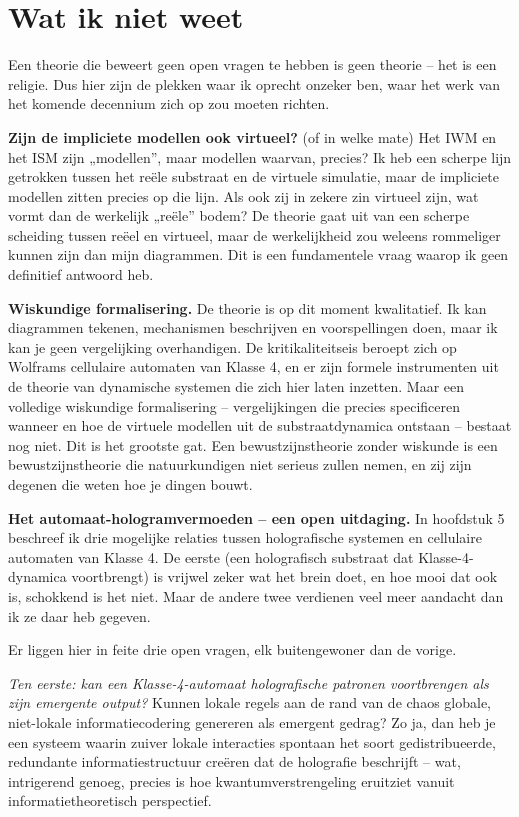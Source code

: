 \documentclass[11pt, twoside, openright]{book}
\begin{document}
\section*{Wat ik niet weet}

Een theorie die beweert geen open vragen te hebben is geen theorie -- het is een religie. Dus hier zijn de plekken waar ik oprecht onzeker ben, waar het werk van het komende decennium zich op zou moeten richten.

\textbf{Zijn de impliciete modellen ook virtueel?} (of in welke mate) Het IWM en het ISM zijn „modellen”, maar modellen waarvan, precies? Ik heb een scherpe lijn getrokken tussen het reële substraat en de virtuele simulatie, maar de impliciete modellen zitten precies op die lijn. Als ook zij in zekere zin virtueel zijn, wat vormt dan de werkelijk „reële” bodem? De theorie gaat uit van een scherpe scheiding tussen reëel en virtueel, maar de werkelijkheid zou weleens rommeliger kunnen zijn dan mijn diagrammen. Dit is een fundamentele vraag waarop ik geen definitief antwoord heb.

\textbf{Wiskundige formalisering.} De theorie is op dit moment kwalitatief. Ik kan diagrammen tekenen, mechanismen beschrijven en voorspellingen doen, maar ik kan je geen vergelijking overhandigen. De kritikaliteitseis beroept zich op Wolframs cellulaire automaten van Klasse 4, en er zijn formele instrumenten uit de theorie van dynamische systemen die zich hier laten inzetten. Maar een volledige wiskundige formalisering -- vergelijkingen die precies specificeren wanneer en hoe de virtuele modellen uit de substraatdynamica ontstaan -- bestaat nog niet. Dit is het grootste gat. Een bewustzijnstheorie zonder wiskunde is een bewustzijnstheorie die natuurkundigen niet serieus zullen nemen, en zij zijn degenen die weten hoe je dingen bouwt.

\textbf{Het automaat-hologramvermoeden -- een open uitdaging.} In hoofdstuk 5 beschreef ik drie mogelijke relaties tussen holografische systemen en cellulaire automaten van Klasse 4. De eerste (een holografisch substraat dat Klasse-4-dynamica voortbrengt) is vrijwel zeker wat het brein doet, en hoe mooi dat ook is, schokkend is het niet. Maar de andere twee verdienen veel meer aandacht dan ik ze daar heb gegeven.

Er liggen hier in feite drie open vragen, elk buitengewoner dan de vorige.

\textit{Ten eerste: kan een Klasse-4-automaat holografische patronen voortbrengen als zijn emergente output?} Kunnen lokale regels aan de rand van de chaos globale, niet-lokale informatiecodering genereren als emergent gedrag? Zo ja, dan heb je een systeem waarin zuiver lokale interacties spontaan het soort gedistribueerde, redundante informatiestructuur creëren dat de holografie beschrijft -- wat, intrigerend genoeg, precies is hoe kwantumverstrengeling eruitziet vanuit informatietheoretisch perspectief.
\end{document}
